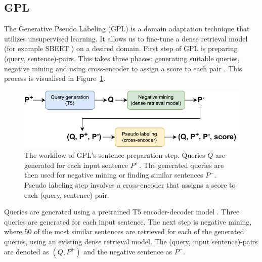 \documentclass[fleqn,moreauthors,10pt]{ds_report}
\begin{document}


\subsection*{GPL}

The Generative Pseudo Labeling (GPL) is a domain adaptation technique that utilizes unsupervised learning. It allows us to fine-tune a dense retrieval model (for example SBERT \cite{SBERT}) on a desired domain. First step of GPL is preparing (query, sentence)-pairs. This takes three phases: generating suitable queries, negative mining and using cross-encoder to assign a score to each pair \cite{GPL}. This process is visualised in Figure~\ref{fig:GPL}.

\begin{figure}[ht]\centering
	\vspace{12 pt}
	\includegraphics[width=\linewidth]{GPL_data_preprocessing.pdf}
	\vspace{5 pt}
	\caption{The workflow of GPL's sentence preparation step. Queries $Q$ are generated for each input sentence $P^{+}$. The generated queries are then used for negative mining or finding similar sentences $P^{-}$. Pseudo labeling step involves a cross-encoder that assigns a score to each (query, sentence)-pair.}
	\label{fig:GPL}
\end{figure}

Queries are generated using a pretrained T5 encoder-decoder model \cite{T5}. Three queries are generated for each input sentence. The next step is negative mining, where 50 of the most similar sentences are retrieved for each of the generated queries, using an existing dense retrieval model. The (query, input sentence)-pairs are denoted as $(Q, P^{+})$ and the negative sentence as $P^{-}$.
\end{document}
